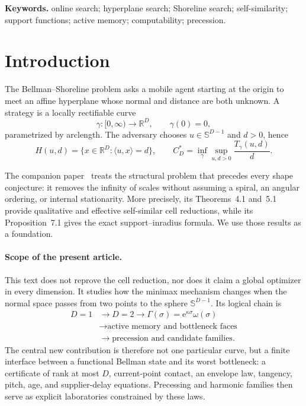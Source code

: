 \documentclass[10pt,a4paper]{article}
\newcommand{\R}{\mathbb{R}}
\newcommand{\Sph}{\mathbb{S}}
\newcommand{\e}{\mathrm{e}}
\newcommand{\cstar}{C^{*}}
\theoremstyle{plain}
\theoremstyle{definition}
\theoremstyle{remark}
\begin{document}
\noindent\textbf{Keywords.} online search; hyperplane search; Shoreline search; self-similarity; support functions; active memory; computability; precession.

\section{Introduction}

The Bellman--Shoreline problem asks a mobile agent starting at the origin to meet an affine hyperplane whose normal and distance are both unknown. A strategy is a locally rectifiable curve
\[
  \gamma:[0,\infty)\to\R^D,
  \qquad \gamma(0)=0,
\]
parametrized by arclength. The adversary chooses $u\in\Sph^{D-1}$ and $d>0$, hence
\[
  H(u,d)=\{x\in\R^D:\langle u,x\rangle=d\},
  \qquad
  \cstar_D=\inf_{\gamma}\sup_{u,d>0}\frac{T_\gamma(u,d)}{d}.
\]

The companion paper~\cite{koch-cell} treats the structural problem that precedes every shape conjecture: it removes the infinity of scales without assuming a spiral, an angular ordering, or internal stationarity. More precisely, its Theorems~4.1 and~5.1 provide qualitative and effective self-similar cell reductions, while its Proposition~7.1 gives the exact support--inradius formula. We use those results as a foundation.

\paragraph{Scope of the present article.}
This text does not reprove the cell reduction, nor does it claim a global optimizer in every dimension. It studies how the minimax mechanism changes when the normal space passes from two points to the sphere $\Sph^{D-1}$. Its logical chain is
\[
\begin{aligned}
  D=1 &\longrightarrow D=2
  \longrightarrow \Gamma(\sigma)=\e^{\kappa\sigma}\omega(\sigma)\\
  &\longrightarrow \text{active memory and bottleneck faces}\\
  &\longrightarrow \text{precession and candidate families}.
\end{aligned}
\]
The central new contribution is therefore not one particular curve, but a finite interface between a functional Bellman state and its worst bottleneck: a certificate of rank at most $D$, current-point contact, an envelope law, tangency, pitch, age, and supplier-delay equations. Precessing and harmonic families then serve as explicit laboratories constrained by these laws.
\end{document}
